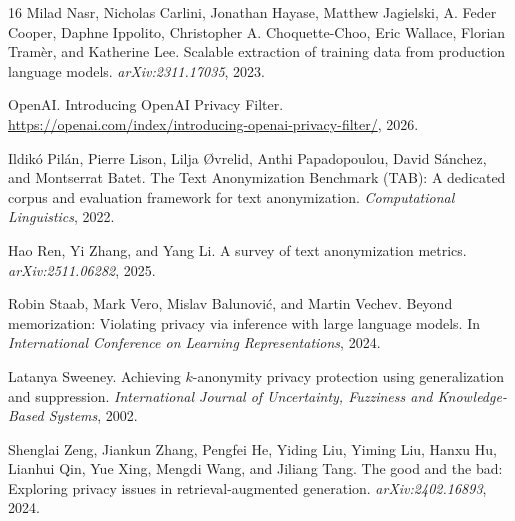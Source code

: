 \documentclass{article}
\begin{document}
\begin{thebibliography}{16}
Milad Nasr, Nicholas Carlini, Jonathan Hayase, Matthew Jagielski, A. Feder Cooper, Daphne Ippolito, Christopher A. Choquette-Choo, Eric Wallace, Florian Tram{\`e}r, and Katherine Lee.
\newblock Scalable extraction of training data from production language models.
\newblock \emph{arXiv:2311.17035}, 2023.

OpenAI.
\newblock Introducing OpenAI Privacy Filter.
\newblock \url{https://openai.com/index/introducing-openai-privacy-filter/}, 2026.

Ildik{\'o} Pil{\'a}n, Pierre Lison, Lilja {\O}vrelid, Anthi Papadopoulou, David S{\'a}nchez, and Montserrat Batet.
\newblock The Text Anonymization Benchmark (TAB): A dedicated corpus and evaluation framework for text anonymization.
\newblock \emph{Computational Linguistics}, 2022.

Hao Ren, Yi Zhang, and Yang Li.
\newblock A survey of text anonymization metrics.
\newblock \emph{arXiv:2511.06282}, 2025.

Robin Staab, Mark Vero, Mislav Balunovi{\'c}, and Martin Vechev.
\newblock Beyond memorization: Violating privacy via inference with large language models.
\newblock In \emph{International Conference on Learning Representations}, 2024.

Latanya Sweeney.
\newblock Achieving $k$-anonymity privacy protection using generalization and suppression.
\newblock \emph{International Journal of Uncertainty, Fuzziness and Knowledge-Based Systems}, 2002.

Shenglai Zeng, Jiankun Zhang, Pengfei He, Yiding Liu, Yiming Liu, Hanxu Hu, Lianhui Qin, Yue Xing, Mengdi Wang, and Jiliang Tang.
\newblock The good and the bad: Exploring privacy issues in retrieval-augmented generation.
\newblock \emph{arXiv:2402.16893}, 2024.

\end{thebibliography}
\end{document}
